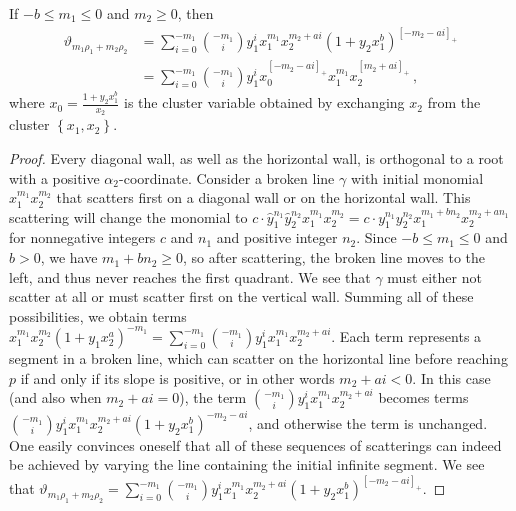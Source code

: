 \documentclass[ALCO,ThmDefs,Unicode,epreuves]{cedram}
\newcommand{\thet}{\vartheta}
\newcommand{\set}[1]{{\left\lbrace #1 \right\rbrace}}
\newcommand{\hy}{\hat{y}}
\begin{document}
\begin{prop}\label{theta m1 b}
If $-b\le m_1\le0$ and $m_2\ge0$, then 
\begin{align*}
\thet_{m_1\rho_1+m_2\rho_2}&=\sum_{i=0}^{-m_1}\binom{-m_1}iy_1^ix_1^{m_1}x_2^{m_2+ai}(1+y_2x_1^b)^{[-m_2-ai]_+}\\
&=\sum_{i=0}^{-m_1}\binom{-m_1}{i}y_1^ix_0^{[-m_2-ai]_+}x_1^{m_1}x_2^{[m_2+ai]_+}\,, 
\end{align*}
where $x_0=\frac{1+y_2x_1^b}{x_2}$ is the cluster variable obtained by exchanging $x_2$ from the cluster $\set{x_1,x_2}$. 
\end{prop}
\begin{proof}
Every diagonal wall, as well as the horizontal wall, is orthogonal to a root with a positive $\alpha_2$-coordinate.
Consider a broken line $\gamma$ with initial monomial $x_1^{m_1}x_2^{m_2}$ that scatters first on a diagonal wall or on the horizontal wall.
This scattering will change the monomial to $c\cdot \hy_1^{n_1}\hy_2^{n_2}x_1^{m_1}x_2^{m_2}=c\cdot y_1^{n_1}y_2^{n_2}x_1^{m_1+bn_2}x_2^{m_2+an_1}$ for nonnegative integers $c$ and $n_1$ and positive integer $n_2$.
Since $-b\le m_1\le0$ and $b>0$, we have $m_1+bn_2\ge0$, so after scattering, the broken line moves to the left, and thus never reaches the first quadrant.
We see that $\gamma$ must either not scatter at all or must scatter first on the vertical wall.
Summing all of these possibilities, we obtain terms $x_1^{m_1}x_2^{m_2}(1+y_1x_2^a)^{-m_1}=\sum_{i=0}^{-m_1}\binom{-m_1}iy_1^ix_1^{m_1}x_2^{m_2+ai}$.
Each term represents a segment in a broken line, which can scatter on the horizontal line before reaching $p$ if and only if its slope is positive, or in other words $m_2+ai<0$.
In this case (and also when $m_2+ai=0$), the term $\binom{-m_1}iy_1^ix_1^{m_1}x_2^{m_2+ai}$ becomes terms $\binom{-m_1}iy_1^ix_1^{m_1}x_2^{m_2+ai}(1+y_2x_1^b)^{-m_2-ai}$, and otherwise the term is unchanged.
One easily convinces oneself that all of these sequences of scatterings can indeed be achieved by varying the line containing the initial infinite segment.
We see that $\thet_{m_1\rho_1+m_2\rho_2}=\sum_{i=0}^{-m_1}\binom{-m_1}iy_1^ix_1^{m_1}x_2^{m_2+ai}(1+y_2x_1^b)^{[-m_2-ai]_+}$.
\end{proof}
\end{document}

